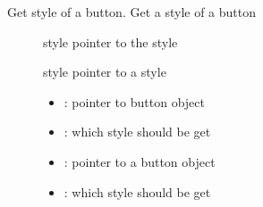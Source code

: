 \documentclass[letterpaper,10pt,english]{sphinxmanual}
\begin{document}

\begin{fulllineitems}
\label{\detokenize{object-types/btn:_CPPv416lv_btn_get_stylePK8lv_obj_t14lv_btn_style_t}}%
\pysigstartmultiline
{}\label{\detokenize{object-types/btn:lv__btn_8h_1a0ffe58eb72810d1ca1cacaed6c4e47d2}}%
\pysigstopmultiline
Get style of a button. 
Get a style of a button 
\begin{description}
\item[{}] \leavevmode
style pointer to the style

\item[{}] \leavevmode
style pointer to a style 

\item[{}] \leavevmode\begin{itemize}
\item {} 
: pointer to button object 

\item {} 
: which style should be get 

\end{itemize}

\item[{}] \leavevmode\begin{itemize}
\item {} 
: pointer to a button object 

\item {} 
: which style should be get 

\end{itemize}

\end{description}


\end{fulllineitems}

\end{document}
